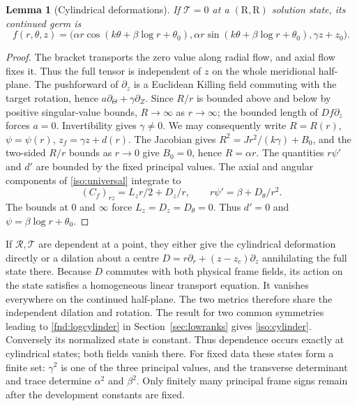 \documentclass[11pt,a4paper]{article}
\numberwithin{equation}{section}
\theoremstyle{plain}
\newtheorem{lemma}[theorem]{Lemma}
\theoremstyle{definition}
\theoremstyle{remark}
\begin{document}
\begin{lemma}[Cylindrical deformations]\label{iso:axial-exit}
If $\mathcal T=0$ at a $(\mathrm{R},\mathrm{R})$ solution state, its continued germ is
\begin{equation}\label{iso:cylinder}
 f(r,\theta,z)=\bigl(\alpha r\cos(k\theta+\beta\log r+\theta_0),
 \alpha r\sin(k\theta+\beta\log r+\theta_0),\gamma z+z_0\bigr).
\end{equation}
\end{lemma}
\begin{proof}
The bracket transports the zero value along radial flow, and axial flow
fixes it.  Thus the full tensor is independent of $z$ on the whole
meridional half-plane.  The pushforward of $\partial_z$ is a Euclidean
Killing field commuting with the target rotation, hence
$a\partial_\Theta+\gamma\partial_Z$.  Since $R/r$ is bounded above and below
by positive singular-value bounds, $R\to\infty$ as $r\to\infty$;
the bounded length of $Df\partial_z$ forces $a=0$.  Invertibility gives
$\gamma\ne0$.  We may consequently write
$R=R(r)$, $\psi=\psi(r)$, $z_f=\gamma z+d(r)$.
The Jacobian gives
$R^2=Jr^2/(k\gamma)+B_0$, and the two-sided $R/r$ bounds as $r\to0$ give
$B_0=0$, hence $R=\alpha r$.
The quantities $r\psi'$ and $d'$ are bounded by the fixed principal values.
The axial and angular components of \eqref{iso:universal} integrate to
\[
 (C_f)_{rz}=L_zr/2+D_z/r,\qquad r\psi'=\beta+D_\theta/r^2.
\]
The bounds at $0$ and $\infty$ force $L_z=D_z=D_\theta=0$.
Thus $d'=0$ and $\psi=\beta\log r+\theta_0$.
\end{proof}

If $\mathcal R,\mathcal T$ are dependent at a point, they either give
the cylindrical deformation directly or a dilation about a centre
$D=r\partial_r+(z-z_c)\partial_z$ annihilating the full state there.
Because $D$ commutes with both physical frame fields, its action on the
state satisfies a homogeneous linear transport equation.  It vanishes
everywhere on the continued half-plane.  The two metrics therefore share
the independent dilation and rotation. The result for two common symmetries
leading to \eqref{fnd:logcylinder} in Section~\ref{sec:lowranks} gives
\eqref{iso:cylinder}.  Conversely its normalized state is constant.
Thus dependence occurs exactly at cylindrical states; both fields vanish
there. For fixed data these states form a finite set: $\gamma^2$
is one of the three principal values, and the transverse determinant and
trace determine $\alpha^2$ and $\beta^2$. Only finitely many principal frame
signs remain after the development constants are fixed.
\end{document}
